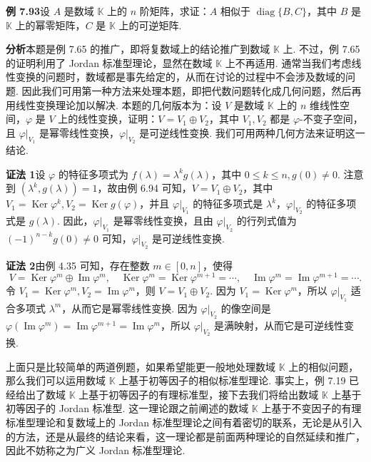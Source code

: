 \documentclass[UTF8,12pt,a4paper,fontset=fandol]{ctexart}
\begin{document}
\noindent\textbf{例 7.93}\quad 设 $A$ 是数域 $\mathbb{K}$ 上的 $n$ 阶矩阵，求证：$A$ 相似于 $\operatorname{diag}\{B,C\}$，其中 $B$ 是 $\mathbb{K}$ 上的幂零矩阵，$C$ 是 $\mathbb{K}$ 上的可逆矩阵.

\noindent\textbf{分析}\quad 本题是例 7.65 的推广，即将复数域上的结论推广到数域 $\mathbb{K}$ 上. 不过，例 7.65 的证明利用了 Jordan 标准型理论，显然在数域 $\mathbb{K}$ 上不再适用. 通常当我们考虑线性变换的问题时，数域都是事先给定的，从而在讨论的过程中不会涉及数域的问题. 因此我们可用第一种方法来处理本题，即把代数问题转化成几何问题，然后再用线性变换理论加以解决. 本题的几何版本为：设 $V$ 是数域 $\mathbb{K}$ 上的 $n$ 维线性空间，$\varphi$ 是 $V$ 上的线性变换，证明：$V=V_1\oplus V_2$，其中 $V_1,V_2$ 都是 $\varphi$-不变子空间，且 $\varphi|_{V_1}$ 是幂零线性变换，$\varphi|_{V_2}$ 是可逆线性变换. 我们可用两种几何方法来证明这一结论.

\noindent\textbf{证法 1}\quad 设 $\varphi$ 的特征多项式为 $f(\lambda)=\lambda^kg(\lambda)$，其中 $0\le k\le n,g(0)\ne0$. 注意到 $(\lambda^k,g(\lambda))=1$，故由例 6.94 可知，$V=V_1\oplus V_2$，其中 $V_1=\operatorname{Ker}\varphi^k,V_2=\operatorname{Ker}g(\varphi)$，并且 $\varphi|_{V_1}$ 的特征多项式是 $\lambda^k$，$\varphi|_{V_2}$ 的特征多项式是 $g(\lambda)$. 因此，$\varphi|_{V_1}$ 是幂零线性变换，且由 $\varphi|_{V_2}$ 的行列式值为 $(-1)^{n-k}g(0)\ne0$ 可知，$\varphi|_{V_2}$ 是可逆线性变换.

\noindent\textbf{证法 2}\quad 由例 4.35 可知，存在整数 $m\in[0,n]$，使得
\[
V=\operatorname{Ker}\varphi^m\oplus\operatorname{Im}\varphi^m,\quad
\operatorname{Ker}\varphi^m=\operatorname{Ker}\varphi^{m+1}=\cdots,\quad
\operatorname{Im}\varphi^m=\operatorname{Im}\varphi^{m+1}=\cdots.
\]
令 $V_1=\operatorname{Ker}\varphi^m,V_2=\operatorname{Im}\varphi^m$，则 $V=V_1\oplus V_2$. 因为 $V_1=\operatorname{Ker}\varphi^m$，所以 $\varphi|_{V_1}$ 适合多项式 $\lambda^m$，从而它是幂零线性变换. 因为 $\varphi|_{V_2}$ 的像空间是 $\varphi(\operatorname{Im}\varphi^m)=\operatorname{Im}\varphi^{m+1}=\operatorname{Im}\varphi^m$，所以 $\varphi|_{V_2}$ 是满映射，从而它是可逆线性变换.

上面只是比较简单的两道例题，如果希望能更一般地处理数域 $\mathbb{K}$ 上的相似问题，那么我们可以运用数域 $\mathbb{K}$ 上基于初等因子的相似标准型理论. 事实上，例 7.19 已经给出了数域 $\mathbb{K}$ 上基于初等因子的有理标准型，接下去我们将给出数域 $\mathbb{K}$ 上基于初等因子的 Jordan 标准型. 这一理论跟之前阐述的数域 $\mathbb{K}$ 上基于不变因子的有理标准型理论和复数域上的 Jordan 标准型理论之间有着密切的联系，无论是从引入的方法，还是从最终的结论来看，这一理论都是前面两种理论的自然延续和推广，因此不妨称之为广义 Jordan 标准型理论.
\end{document}
